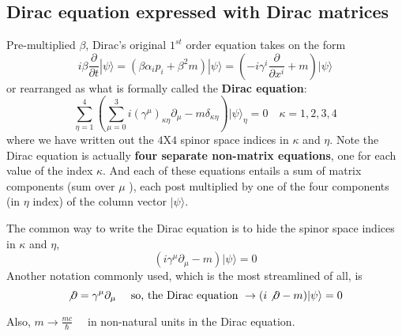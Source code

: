 \subsection{Dirac equation expressed with Dirac matrices}
Pre-multiplied $\beta$, Dirac's original $1^{st}$ order equation takes on the form
\begin{equation}
i \beta \frac{\partial}{\partial t}|\psi\rangle=\left(\beta \alpha_{i} p_{i}+\beta^{2} m\right) | \psi\rangle=\left(-i \gamma^{i} \frac{\partial}{\partial x^{i}}+m\right)|\psi\rangle
\end{equation}
or rearranged as what is formally called the \textbf{Dirac equation}:
\begin{equation}
\sum_{\eta=1}^{4}\left(\sum_{\mu=0}^{3} i\left(\gamma^{\mu}\right)_{\kappa \eta} \partial_{\mu}-m \delta_{\kappa \eta}\right)|\psi\rangle_{\eta}=0 \quad \kappa=1,2,3,4
\end{equation}
where we have written out the $4 \mathrm{X} 4$ spinor space indices in $\kappa$ and $\eta$. Note the Dirac equation is actually \textbf{four separate non-matrix equations}, one for each value of the index $\kappa$. And each of these equations entails a sum of matrix components (sum over $\mu$ ), each post multiplied by one of the four components (in $\eta$ index) of the column vector $|\psi\rangle$.
\begin{qt}
    The common way to write the Dirac equation is to hide the spinor space indices in $\kappa$ and $\eta$,
    \begin{equation}
\left(i \gamma^{\mu} \partial_{\mu}-m\right)|\psi\rangle= 0
\label{convenient-Dirac-eq}
\end{equation}
Another notation commonly used, which is the most streamlined of all, is
$$
\not \partial=\gamma^{\mu} \partial_{\mu} \quad \text { so, the Dirac equation } \rightarrow(i \not \partial-m)|\psi\rangle= 0
$$
\end{qt}
Also, $m \rightarrow \frac{m c}{\hbar} \quad$ in non-natural units in the Dirac equation.

